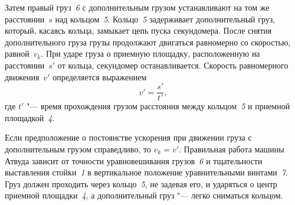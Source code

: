 \documentclass[a4paper, 12pt]{extarticle}
\begin{document}
Затем правый груз~\emph{6} с дополнительным грузом устанавливают на том же расстоянии~$s$ над кольцом~\emph{5}. Кольцо~\emph{5} задерживает дополнительный груз, который, касаясь кольца, замыкает цепь пуска секундомера. После снятия дополнительного груза грузы продолжают двигаться равномерно со скоростью, равной~$v_k$. При ударе груза о приемную площадку, расположенную на расстоянии~$s'$ от кольца, секундомер останавливается. Скорость равномерного движения~$v'$ определяется выражением
\begin{equation}
\label{eq:m2-constant-motion-speed}
v' = \frac{s'}{t'},
\end{equation}
где $t'$ "--- время прохождения грузом расстояния между кольцом~\emph{5} и приемной площадкой~\emph{4}. %

Если предположение о постоянстве ускорения при движении груза с дополнительным грузом справедливо, то $v_k = v'$. Правильная работа машины Атвуда зависит от точности уравновешивания грузов~\emph{6} и тщательности выставления стойки~\emph{1} в вертикальное положение уравнительными винтами~\emph{7}. Груз должен проходить через кольцо~\emph{5}, не задевая его, и ударяться о центр приемной площадки~\emph{4}, а дополнительный груз "--- легко сниматься кольцом. %
\end{document}
